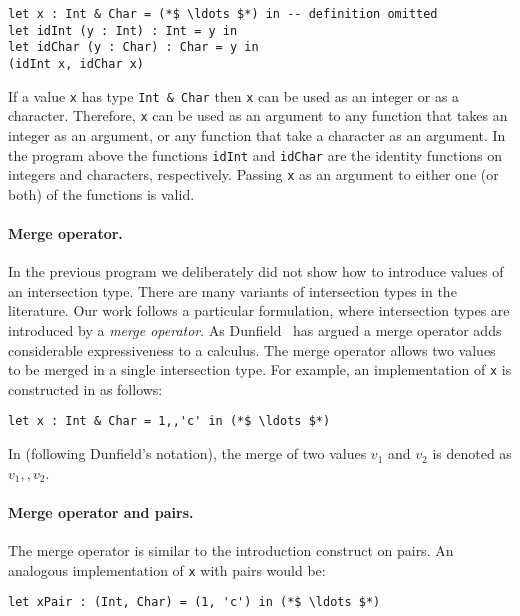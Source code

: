 \begin{lstlisting}
let x : Int & Char = (*$ \ldots $*) in -- definition omitted
let idInt (y : Int) : Int = y in
let idChar (y : Char) : Char = y in
(idInt x, idChar x)
\end{lstlisting}

\noindent If a value \lstinline{x} has type \lstinline{Int & Char} then
\lstinline{x} can be used as an integer or as a character. Therefore,
\lstinline{x} can be used as an argument to any function that takes
an integer as an argument, or any
function that take a character as an argument. In the program above
the functions \lstinline{idInt} and \lstinline{idChar} are the
identity functions on integers and characters, respectively.
Passing \lstinline{x} as an argument to either one (or both) of the
functions is valid.

\paragraph{Merge operator.}
In the previous program we deliberately did not show how to introduce values of
an intersection type. There are many variants of intersection types in the
literature. Our work follows a particular formulation, where intersection types
are introduced by a \emph{merge operator}. As
Dunfield~\cite{dunfield2014elaborating} has argued a merge operator adds
considerable expressiveness to a calculus. The merge operator allows two values
to be merged in a single intersection type. For example, an implementation of
\lstinline{x} is constructed in \name as follows:

\begin{lstlisting}
let x : Int & Char = 1,,'c' in (*$ \ldots $*)
\end{lstlisting}

\noindent In \name (following Dunfield's notation), the
merge of two values $v_1$ and $v_2$ is denoted as $v_1 ,, v_2$.

\paragraph{Merge operator and pairs.}
The merge operator is similar to the introduction construct on pairs.
An analogous implementation of \lstinline{x} with pairs would be:

\begin{lstlisting}
let xPair : (Int, Char) = (1, 'c') in (*$ \ldots $*)
\end{lstlisting}

